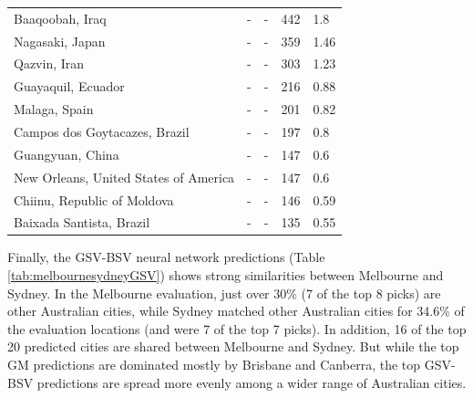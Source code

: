 \documentclass[10pt,letterpaper]{article}
\begin{document}
\begin{table}[!htbp]
\begin{adjustwidth}{-2.25in}{0in}
\begin{tabular}{ l  l l l  l}
Baaqoobah, Iraq &-&- & 442 & 1.8\\ 
Nagasaki, Japan &-&- & 359 & 1.46\\ 
Qazvin, Iran &-&- & 303 & 1.23\\ 
Guayaquil, Ecuador &-&- & 216 & 0.88\\ 
Malaga, Spain &-&- & 201 & 0.82\\ 
Campos dos Goytacazes, Brazil &-&- & 197 & 0.8\\ 
Guangyuan, China &-&- & 147 & 0.6\\ 
New Orleans, United States of America &-&- & 147 & 0.6\\ 
Chiinu, Republic of Moldova &-&- & 146 & 0.59\\ 
Baixada Santista, Brazil &-&- & 135 & 0.55\\ \hline
\end{tabular}
\end{adjustwidth}
\end{table}


Finally, the GSV-BSV neural network predictions (Table \ref{tab:melbournesydneyGSV}) shows strong similarities between Melbourne and Sydney. In the Melbourne evaluation, just over 30\% (7 of the top 8 picks) are other Australian cities, while Sydney matched other Australian cities for 34.6\% of the evaluation locations (and were 7 of the top 7 picks). In addition, 16 of the top 20 predicted cities are shared between Melbourne and Sydney. But while the top GM predictions are dominated mostly by Brisbane and Canberra, the top GSV-BSV predictions are spread more evenly among a wider range of Australian cities.
\end{document}
